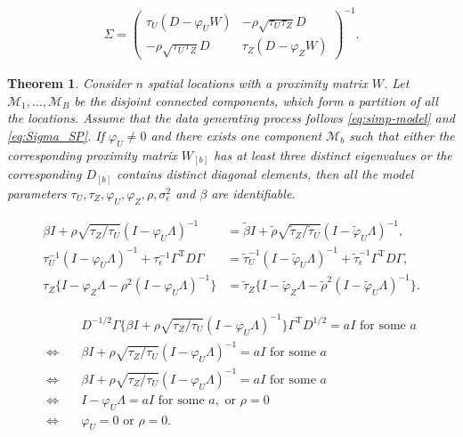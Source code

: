 \documentclass[10pt,a4paper]{amsart}
\newtheorem{theorem}{Theorem}
\def\top{{ \mathrm{\scriptscriptstyle T} }}
\begin{document}
\begin{align}\label{eq:Sigma_SP}
    \Sigma = 
    \begin{pmatrix} 
        \tau_U(D-\varphi_U W) & -\rho\sqrt{\tau_U\tau_Z} D \\
        -\rho\sqrt{\tau_U\tau_Z} D & \tau_Z(D-\varphi_Z W)
    \end{pmatrix}^{-1}.
\end{align}

\begin{theorem}\label{thm:car-identifiability}
Consider $n$ spatial locations with a proximity matrix $W$. 
Let 
$\mathcal{M}_1,...,\mathcal{M}_B$ be the disjoint connected components, which form a partition of all the locations. 
Assume that the data generating process follows \eqref{eq:simp-model} and \eqref{eq:Sigma_SP}. 
If $\varphi_U
\neq
0$ and there exists one component $\mathcal{M}_b$ such that 
either the corresponding proximity matrix $W_{[b]}$ has at least three distinct eigenvalues or the corresponding $D_{[b]}$ contains distinct diagonal elements, then all the model parameters $\tau_U, \tau_Z, \varphi_U, \varphi_Z, \rho, \sigma_\epsilon^2$ and $\beta$ are identifiable. 
\end{theorem}

\begin{align}
    \beta I + \rho \sqrt{\tau_Z/\tau_U} (I-\varphi_U \Lambda)^{-1} & = 
    \tilde{\beta} I + \tilde{\rho} \sqrt{\tilde{\tau}_Z/\tilde{\tau}_U} (I-\tilde{\varphi}_U \Lambda)^{-1}, 
    \label{eq:iden_cond_mean_Y_Z}
    \\ 
    \tau_U^{-1} (I-\varphi_U \Lambda)^{-1} 
    +\tau_{\epsilon}^{-1} \Gamma^\top D \Gamma
    & = 
    \tilde{\tau}_U^{-1} (I-\tilde{\varphi}_U \Lambda)^{-1} 
    +\tilde{\tau}_{\epsilon}^{-1} \Gamma^\top D \Gamma, 
    \label{eq:iden_var_mean_Y_Z}
    \\ 
    \tau_Z \big\{ I - \varphi_Z \Lambda - \rho^2 (I - \varphi_U \Lambda)^{-1} \big\}
    & = 
    \tilde{\tau}_Z \big\{ I - \tilde{\varphi}_Z \Lambda - \tilde{\rho}^2 (I - \tilde{\varphi}_U \Lambda)^{-1} \big\}.
    \label{eq:prec_Z}
\end{align}

\begin{align*}
    & D^{-1/2} \Gamma
    \big\{ \beta I +\rho \sqrt{\tau_Z/\tau_U} (I-\varphi_U \Lambda)^{-1} \big\} 
    \Gamma^{\top} D^{1/2}
    = aI \text{ for some } a
    \\
    \Longleftrightarrow \quad  
    & 
    \beta I +\rho \sqrt{\tau_Z/\tau_U} (I-\varphi_U \Lambda)^{-1} 
    = aI \text{ for some } a
    \\
    \Longleftrightarrow \quad  
    & 
    \beta I +\rho \sqrt{\tau_Z/\tau_U} (I-\varphi_U \Lambda)^{-1} 
    = aI \text{ for some } a
    \\
    \Longleftrightarrow \quad  
    & 
    I-\varphi_U \Lambda
    = aI \text{ for some } a, \text{ or } \rho = 0\\
    \Longleftrightarrow \quad  
    & 
    \varphi_U = 0 \text{ or } \rho = 0. 
\end{align*}
\end{document}
